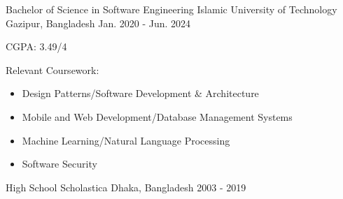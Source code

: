

\begin{cventries}

  \cventry
    {Bachelor of Science in Software Engineering} %
    {Islamic University of Technology} %
    {Gazipur, Bangladesh} %
    {Jan. 2020 - Jun. 2024} %
    {
      \begin{cvitems} %
        \item CGPA: 3.49/4
        \item Relevant Coursework: \begin{itemize}[noitemsep]
               \item Design Patterns/Software Development \& Architecture
               \item Mobile and Web Development/Database Management Systems
               \item Machine Learning/Natural Language Processing
               \item Software Security
              \end{itemize}
      \end{cvitems}
    }

  \cventry
    {High School} %
    {Scholastica} %
    {Dhaka, Bangladesh} %
    {2003 - 2019} %
    {
      \begin{cvitems} %
      \end{cvitems}
    }

\end{cventries}
